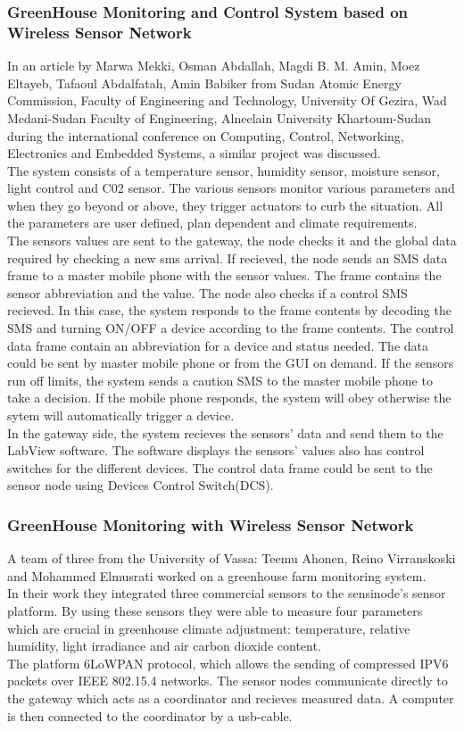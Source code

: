 \documentclass[12pt, a4paper]{article}
\begin{document}
\subsubsection{GreenHouse Monitoring and Control System based on Wireless Sensor Network}
In an article by Marwa Mekki, Osman Abdallah, Magdi B. M. Amin, Moez Eltayeb, Tafaoul Abdalfatah, Amin Babiker \cite{7381396} from Sudan Atomic Energy Commission, Faculty of Engineering and Technology, University Of Gezira, Wad Medani-Sudan Faculty of Engineering, Alneelain University Khartoum-Sudan during the international conference on Computing, Control, Networking, Electronics and Embedded Systems, a similar project was discussed.\\
The system consists of a temperature sensor, humidity sensor, moisture sensor, light control and C02 sensor. The various sensors monitor various parameters and when they go beyond or above, they trigger actuators to curb the situation. All the parameters are user defined, plan dependent and climate requirements.\\
The sensors values are sent to the gateway, the node checks it and the global data required by checking a new sms arrival. If recieved, the node sends an SMS data frame to a master mobile phone with the sensor values. The frame contains the sensor abbreviation and the value. The node also checks if a control SMS recieved. In this case, the system responds to the frame contents by decoding the SMS and turning ON/OFF a device according to the frame contents. The control data frame contain an abbreviation for a device and status needed. The data could be sent by master mobile phone or from the GUI on demand. If the sensors run off limits, the system sends a caution SMS to the master mobile phone to take a decision. If the mobile phone responds, the system will obey otherwise the sytem will automatically trigger a device.\\
In the gateway side, the system recieves the sensors' data and send them to the LabView software. The software displays the sensors' values also has control switches for the different devices. The control data frame could be sent to the sensor node using Devices Control Switch(DCS).  
 
\subsubsection{GreenHouse Monitoring with Wireless Sensor Network}
A team of three from the University of Vassa: Teemu Ahonen, Reino Virranskoski and Mohammed Elmusrati \cite{torabi2023greenhouse} worked on a greenhouse farm monitoring system.\\
In their work they integrated three commercial sensors to the sensinode's sensor platform. By using these sensors they were able to measure four parameters which are crucial in greenhouse climate adjustment: temperature, relative humidity, light irradiance and air carbon dioxide content.\\
The platform 6LoWPAN protocol, which allows the sending of compressed IPV6 packets over IEEE 802.15.4 networks. The sensor nodes communicate directly to the gateway which acts as a coordinator and recieves measured data.  A computer is then connected to the coordinator by a usb-cable. 
\end{document}

